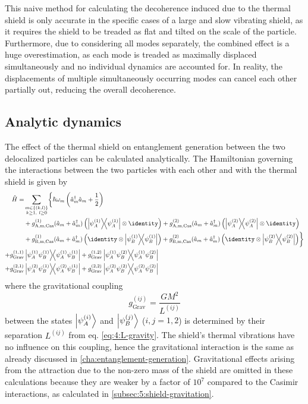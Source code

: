 This naive method for calculating the decoherence induced due to the thermal shield is only accurate in the specific cases of a large and slow vibrating shield, as it requires the shield to be treaded as flat and tilted on the scale of the particle.
Furthermore, due to considering all modes separately, the combined effect is a huge overestimation, as each mode is treaded as maximally displaced simultaneously and no individual dynamics are accounted for.
In reality, the displacements of multiple simultaneously occurring modes can cancel each other partially out, reducing the overall decoherence.


\subsection{Analytic dynamics}\label{subsec:5:entanglement-analytical}
The effect of the thermal shield on entanglement generation between the two delocalized particles can be calculated analytically.
The Hamiltonian governing the interactions between the two particles with each other and with the thermal shield is given by
\begin{align}\label{eq:5:hamiltonian}
  \begin{split}
    \op{H} = &\sum_{\substack{m\in\{(k,l)\}\\ k \geq 1,\ l \geq 0}} \biggl\{ \hbar \omega_m \left(\op{a}^\dagger_m \op{a}_m + \frac{1}{2}\right) \\
    &+ g^{(1)}_\mathrm{A,m,Cas}(\op{a}_m + \op{a}^\dagger_m) \left( \ketbra{\psi^{(1)}_A} \otimes \identity \right)
     + g^{(2)}_\mathrm{A,m,Cas}(\op{a}_m + \op{a}^\dagger_m) \left( \ketbra{\psi^{(2)}_A} \otimes \identity \right) \\
    &+ g^{(1)}_\mathrm{B,m,Cas}(\op{a}_m + \op{a}^\dagger_m) \left( \identity \otimes \ketbra{\psi^{(1)}_B} \right)
     + g^{(2)}_\mathrm{B,m,Cas}(\op{a}_m + \op{a}^\dagger_m) \left( \identity \otimes \ketbra{\psi^{(2)}_B} \right)\biggr\} \\
    + g^{(1,1)}_\mathrm{Grav}&\ketbra{\psi^{(1)}_A \psi^{(1)}_B} + g^{(1,2)}_\mathrm{Grav}\ketbra{\psi^{(1)}_A \psi^{(2)}_B} \\
    + g^{(2,1)}_\mathrm{Grav}&\ketbra{\psi^{(2)}_A \psi^{(1)}_B} + g^{(2,2)}_\mathrm{Grav}\ketbra{\psi^{(2)}_A \psi^{(2)}_B}
  \end{split}
\end{align}
where the gravitational coupling
\begin{equation}
  g^{(ij)}_\mathrm{Grav} = \frac{G M^2}{L^{(ij)}}
\end{equation}
between the states $\ket{\psi^{(i)}_A}$ and $\ket{\psi^{(j)}_B}$ ($i,j = 1,2$) is determined by their separation $L^{(ij)}$ from eq. \eqref{eq:4:L-gravity}.
The shield's thermal vibrations have no influence on this coupling, hence the gravitational interaction is the same as already discussed in \cref{cha:entanglement-generation}.
Gravitational effects arising from the attraction due to the non-zero mass of the shield are omitted in these calculations because they are weaker by a factor of $10^7$ compared to the Casimir interactions, as calculated in \cref{subsec:5:shield-gravitation}.

